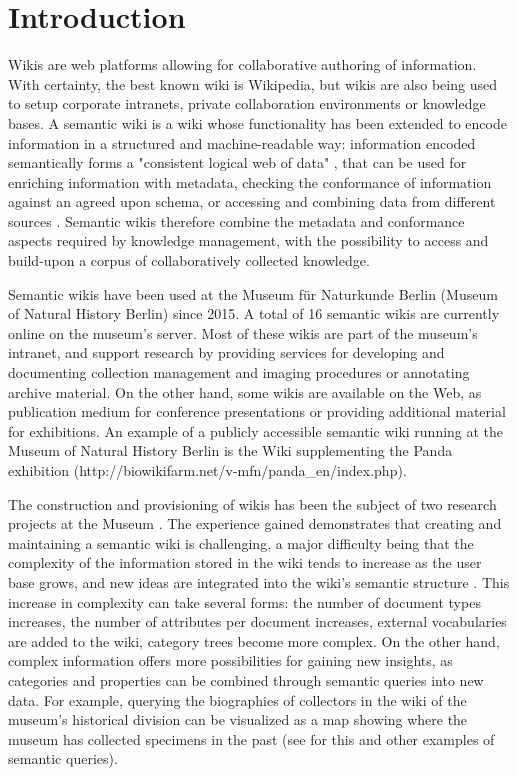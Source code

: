 \documentclass{ijcs_template}
\begin{document}


\section{Introduction}
Wikis are web platforms allowing for collaborative authoring of information. With certainty, the best known wiki is Wikipedia, but wikis are also being used to setup corporate intranets, private collaboration environments or knowledge bases. A semantic wiki is a wiki whose functionality has been extended to encode information in a structured and machine-readable way: information encoded semantically forms a "consistent logical web of data" \cite{berners1998}, that can be used for enriching information with metadata, checking the conformance of information against an agreed upon schema, or accessing and combining data from different sources \cite{oren2006}. Semantic wikis therefore combine the metadata and conformance aspects required by knowledge management, with the possibility to access and build-upon a corpus of collaboratively collected knowledge. 

Semantic wikis have been used at the Museum f\"ur Naturkunde Berlin (Museum of Natural History Berlin) since 2015. A total of 16 semantic wikis are currently online on the museum's server. Most of these wikis are part of the museum's intranet, and support research by providing services for developing and documenting collection management and imaging procedures or annotating archive material. On the other hand, some wikis are available on the Web, as publication medium for conference presentations or providing additional material for exhibitions. An example of a publicly accessible semantic wiki running at the Museum of Natural History Berlin is the Wiki supplementing the Panda exhibition (http://biowikifarm.net/v-mfn/panda\_en/index.php).

The construction and provisioning of wikis has been the subject of two research projects at the Museum \cite{patzschke2016}. The experience gained demonstrates that creating and maintaining a semantic wiki is challenging, a major difficulty being that the complexity of the information stored in the wiki tends to increase as the user base grows, and new ideas are integrated into the wiki's semantic structure \cite{kiniti2013}. This increase in complexity can take several forms: the number of document types increases, the number of attributes per document increases, external vocabularies are added to the wiki, category trees become more complex. On the other hand, complex information offers more possibilities for gaining new insights, as categories and properties can be combined through semantic queries into new data. For example, querying the biographies of collectors in the wiki of the museum's historical division can be visualized as a map showing where the museum has collected specimens in the past (see \cite{ortiz2016} for this and other examples of semantic queries).
\end{document}
